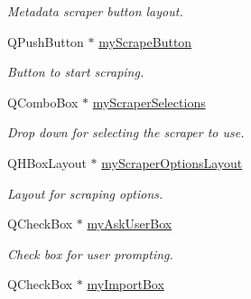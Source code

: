 \begin{DoxyCompactItemize}
\begin{DoxyCompactList}\small\item\em Metadata scraper button layout. \end{DoxyCompactList}\item 
\hypertarget{class_u_i_1_1_info_pane_a8819a32f126921fafac441f43794c001}{Q\-Push\-Button $\ast$ \hyperlink{class_u_i_1_1_info_pane_a8819a32f126921fafac441f43794c001}{my\-Scrape\-Button}}\label{class_u_i_1_1_info_pane_a8819a32f126921fafac441f43794c001}

\begin{DoxyCompactList}\small\item\em Button to start scraping. \end{DoxyCompactList}\item 
\hypertarget{class_u_i_1_1_info_pane_a302ae901fe1a29d9c2e638f548d5018b}{Q\-Combo\-Box $\ast$ \hyperlink{class_u_i_1_1_info_pane_a302ae901fe1a29d9c2e638f548d5018b}{my\-Scraper\-Selections}}\label{class_u_i_1_1_info_pane_a302ae901fe1a29d9c2e638f548d5018b}

\begin{DoxyCompactList}\small\item\em Drop down for selecting the scraper to use. \end{DoxyCompactList}\item 
\hypertarget{class_u_i_1_1_info_pane_a0363b17dccd72bad730fe398d37e7041}{Q\-H\-Box\-Layout $\ast$ \hyperlink{class_u_i_1_1_info_pane_a0363b17dccd72bad730fe398d37e7041}{my\-Scraper\-Options\-Layout}}\label{class_u_i_1_1_info_pane_a0363b17dccd72bad730fe398d37e7041}

\begin{DoxyCompactList}\small\item\em Layout for scraping options. \end{DoxyCompactList}\item 
\hypertarget{class_u_i_1_1_info_pane_aa6351ab732dd1918c81a8fd56b26b221}{Q\-Check\-Box $\ast$ \hyperlink{class_u_i_1_1_info_pane_aa6351ab732dd1918c81a8fd56b26b221}{my\-Ask\-User\-Box}}\label{class_u_i_1_1_info_pane_aa6351ab732dd1918c81a8fd56b26b221}

\begin{DoxyCompactList}\small\item\em Check box for user prompting. \end{DoxyCompactList}\item 
\hypertarget{class_u_i_1_1_info_pane_a6d7e2b90a49c11aa3a525c1323ad818a}{Q\-Check\-Box $\ast$ \hyperlink{class_u_i_1_1_info_pane_a6d7e2b90a49c11aa3a525c1323ad818a}{my\-Import\-Box}}\label{class_u_i_1_1_info_pane_a6d7e2b90a49c11aa3a525c1323ad818a}


\end{DoxyCompactItemize}
